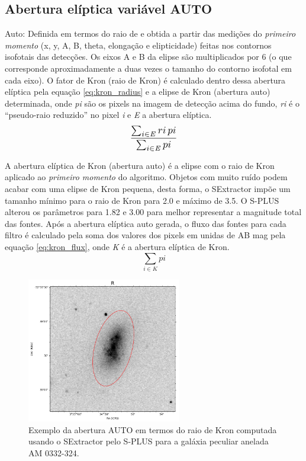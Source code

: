 \subsection{Abertura elíptica variável AUTO}
Auto: Definida em termos do raio de  e obtida a partir das medições do \emph{primeiro momento} (x, y, A, B, theta, elongação e elipticidade) feitas nos contornos isofotais das detecções. Os eixos A e B da elipse são multiplicados por 6 (o que corresponde aproximadamente a duas vezes o tamanho do contorno isofotal em cada eixo). O fator de Kron (raio de Kron) é calculado dentro dessa abertura elíptica pela equação \ref{eq:kron_radius} e a elipse de Kron (abertura auto) determinada, onde \emph{pi} são os pixels na imagem de detecção acima do fundo, \emph{ri} é o ``pseudo-raio reduzido'' no pixel \emph{i} e \emph{E} a abertura elíptica.
\begin{equation} \label{eq:kron_radius}
\scalebox{1.2}{$\displaystyle \frac{\sum_{i \in \mathit{E}} ri \, pi}{\sum_{i \in \mathit{E}} pi}$}
\end{equation}

A abertura elíptica de Kron (abertura auto) é a elipse com o raio de Kron aplicado ao \emph{primeiro momento} do algoritmo. Objetos com muito ruído podem acabar com uma elipse de Kron pequena, desta forma, o SExtractor impõe um tamanho mínimo para o raio de Kron para 2.0 e máximo de 3.5. O S-PLUS alterou os parâmetros para 1.82 e 3.00 para melhor representar a magnitude total das fontes. Após a abertura elíptica auto gerada, o fluxo das fontes para cada filtro é calculado pela soma dos valores dos pixels em unidas de AB mag pela equação \ref{eq:kron_flux}, onde \emph{K} é a abertura elíptica de Kron.
\begin{equation} \label{eq:kron_flux}
\displaystyle
\sum_{i \in K} pi
\end{equation}

\begin{figure}[h]
  \centering 
  \includegraphics[width=0.6\textwidth]{Imagens/auto_exemplo.png} 
  \caption[Exemplo da abertura AUTO para a galáxia AM 0332-324.]{Exemplo da abertura AUTO em termos do raio de Kron computada usando o SExtractor pelo S-PLUS para a galáxia peculiar anelada AM 0332-324.}
  \label{fig:auto_exemplo} 
\end{figure}

